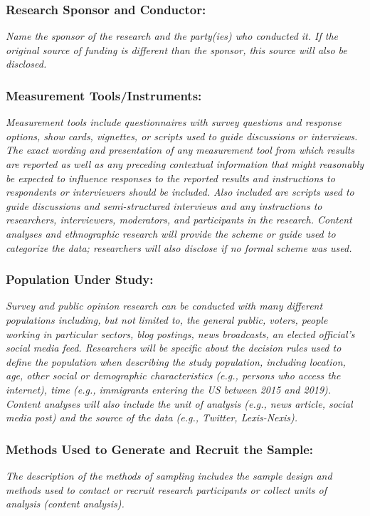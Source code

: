 \documentclass{article}
\begin{document}
\subsubsection*{Research Sponsor and Conductor:} \textit{Name the sponsor of
    the research and the party(ies) who conducted it. If the original source of
    funding is different than the sponsor, this source will also be disclosed.}

\subsubsection*{Measurement Tools/Instruments:} \textit{Measurement tools
    include questionnaires with survey questions and response options, show cards,
    vignettes, or scripts used to guide discussions or interviews. The exact
    wording and presentation of any measurement tool from which results are
    reported as well as any preceding contextual information that might reasonably
    be expected to influence responses to the reported results and instructions to
    respondents or interviewers should be included. Also included are scripts used
    to guide discussions and semi-structured interviews and any instructions to
    researchers, interviewers, moderators, and participants in the research.
    Content analyses and ethnographic research will provide the scheme or guide
    used to categorize the data; researchers will also disclose if no formal scheme
    was used.}

\subsubsection*{Population Under Study:} \textit{Survey and public opinion
    research can be conducted with many different populations including, but not
    limited to, the general public, voters, people working in particular sectors,
    blog postings, news broadcasts, an elected official's social media feed.
    Researchers will be specific about the decision rules used to define the
    population when describing the study population, including location, age, other
    social or demographic characteristics (e.g., persons who access the internet),
    time (e.g., immigrants entering the US between 2015 and 2019). Content analyses
    will also include the unit of analysis (e.g., news article, social media post)
    and the source of the data (e.g., Twitter, Lexis-Nexis).}

\subsubsection*{Methods Used to Generate and Recruit the Sample:} \textit{The
    description of the methods of sampling includes the sample design and methods
    used to contact or recruit research participants or collect units of analysis
    (content analysis).}
\end{document}
